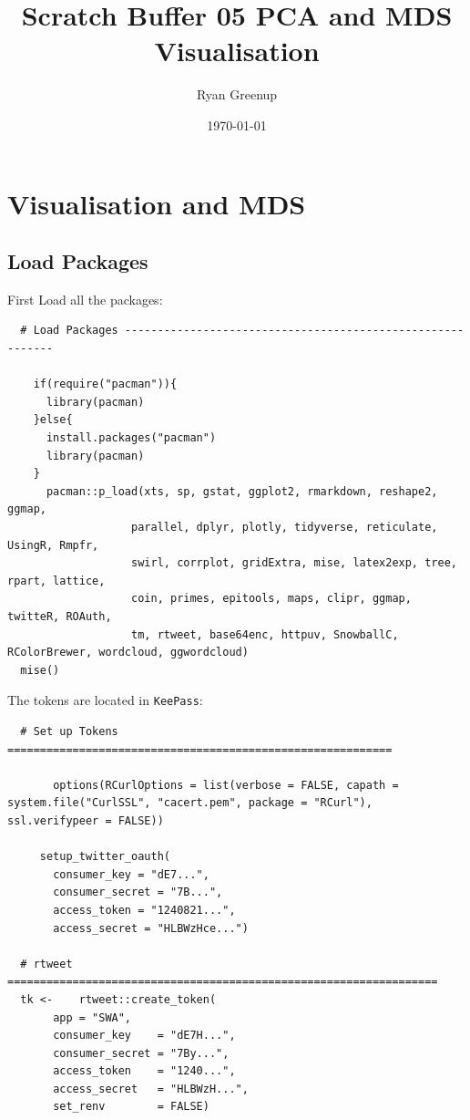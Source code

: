\documentclass[11pt]{article}
\author{Ryan Greenup}
\date{\today}
\title{Scratch Buffer 05 PCA and MDS Visualisation}
\begin{document}
\maketitle
\tableofcontents


\section{Visualisation and MDS}
\label{sec:orgdc07b8f}
\subsection{Load Packages}
\label{sec:org03a95a4}
First Load all the packages:

\begin{verbatim}
  # Load Packages -----------------------------------------------------------

    if(require("pacman")){
      library(pacman)
    }else{
      install.packages("pacman")
      library(pacman)
    }
      pacman::p_load(xts, sp, gstat, ggplot2, rmarkdown, reshape2, ggmap,
                   parallel, dplyr, plotly, tidyverse, reticulate, UsingR, Rmpfr,
                   swirl, corrplot, gridExtra, mise, latex2exp, tree, rpart, lattice,
                   coin, primes, epitools, maps, clipr, ggmap, twitteR, ROAuth,
                   tm, rtweet, base64enc, httpuv, SnowballC, RColorBrewer, wordcloud, ggwordcloud)
  mise()
\end{verbatim}

The tokens are located in \texttt{KeePass}:

\begin{verbatim}
  # Set up Tokens ===========================================================

       options(RCurlOptions = list(verbose = FALSE, capath = system.file("CurlSSL", "cacert.pem", package = "RCurl"), ssl.verifypeer = FALSE))

     setup_twitter_oauth(
       consumer_key = "dE7...",
       consumer_secret = "7B...",
       access_token = "1240821...",
       access_secret = "HLBWzHce...")

  # rtweet ==================================================================
  tk <-    rtweet::create_token(
       app = "SWA",
       consumer_key    = "dE7H...",
       consumer_secret = "7By...",
       access_token    = "1240...",
       access_secret   = "HLBWzH...",
       set_renv        = FALSE)
\end{verbatim}
\end{document}
